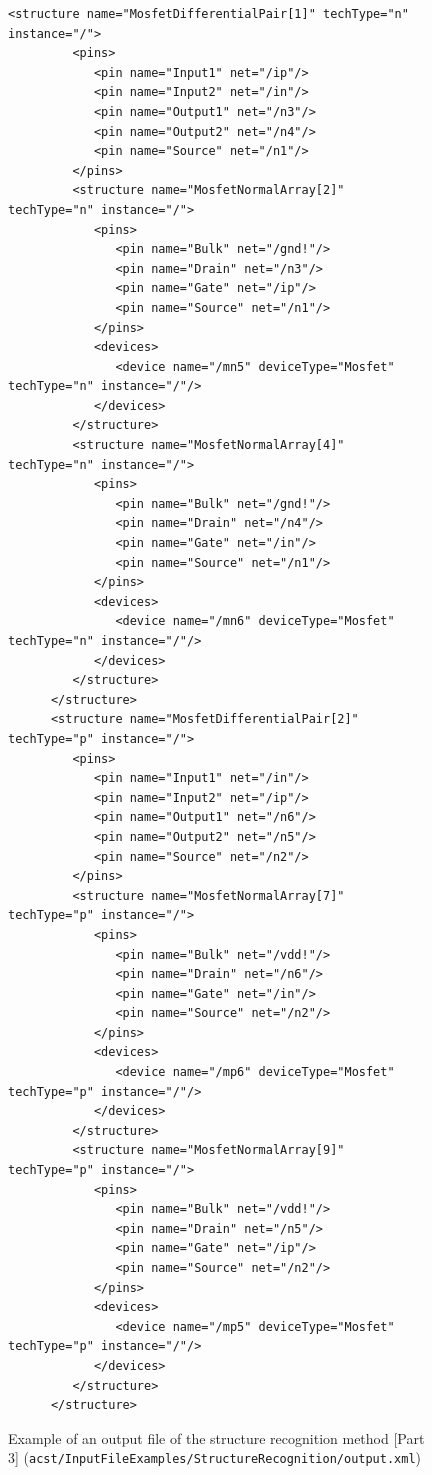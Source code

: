 \begin{figure}[H]
	\begin{lstlisting}[basicstyle=\ttfamily\scriptsize,backgroundcolor={\color{gray!30}}, escapechar=? ]
      <structure name="MosfetDifferentialPair[1]" techType="n" instance="/">
         <pins>
            <pin name="Input1" net="/ip"/>
            <pin name="Input2" net="/in"/>
            <pin name="Output1" net="/n3"/>
            <pin name="Output2" net="/n4"/>
            <pin name="Source" net="/n1"/>
         </pins>
         <structure name="MosfetNormalArray[2]" techType="n" instance="/">
            <pins>
               <pin name="Bulk" net="/gnd!"/>
               <pin name="Drain" net="/n3"/>
               <pin name="Gate" net="/ip"/>
               <pin name="Source" net="/n1"/>
            </pins>
            <devices>
               <device name="/mn5" deviceType="Mosfet" techType="n" instance="/"/>
            </devices>
         </structure>
         <structure name="MosfetNormalArray[4]" techType="n" instance="/">
            <pins>
               <pin name="Bulk" net="/gnd!"/>
               <pin name="Drain" net="/n4"/>
               <pin name="Gate" net="/in"/>
               <pin name="Source" net="/n1"/>
            </pins>
            <devices>
               <device name="/mn6" deviceType="Mosfet" techType="n" instance="/"/>
            </devices>
         </structure>
      </structure>
      <structure name="MosfetDifferentialPair[2]" techType="p" instance="/">
         <pins>
            <pin name="Input1" net="/in"/>
            <pin name="Input2" net="/ip"/>
            <pin name="Output1" net="/n6"/>
            <pin name="Output2" net="/n5"/>
            <pin name="Source" net="/n2"/>
         </pins>
         <structure name="MosfetNormalArray[7]" techType="p" instance="/">
            <pins>
               <pin name="Bulk" net="/vdd!"/>
               <pin name="Drain" net="/n6"/>
               <pin name="Gate" net="/in"/>
               <pin name="Source" net="/n2"/>
            </pins>
            <devices>
               <device name="/mp6" deviceType="Mosfet" techType="p" instance="/"/>
            </devices>
         </structure>
         <structure name="MosfetNormalArray[9]" techType="p" instance="/">
            <pins>
               <pin name="Bulk" net="/vdd!"/>
               <pin name="Drain" net="/n5"/>
               <pin name="Gate" net="/ip"/>
               <pin name="Source" net="/n2"/>
            </pins>
            <devices>
               <device name="/mp5" deviceType="Mosfet" techType="p" instance="/"/>
            </devices>
         </structure>
      </structure>
	\end{lstlisting}
	\caption{Example of an output file of the structure recognition method [Part 3] ({\tt acst/InputFileExamples/StructureRecognition/output.xml})}
\end{figure}

